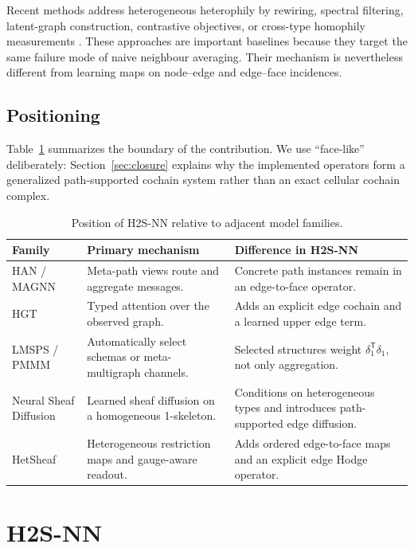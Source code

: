 \documentclass{article}
\newcommand{\method}{\textsc{H2S-NN}}
\newcommand{\transpose}{\mathsf{T}}
\begin{document}
Recent methods address heterogeneous heterophily by rewiring, spectral filtering, latent-graph
construction, contrastive objectives, or cross-type homophily measurements
\citep{guo2023hdhgr,lu2024h2sgnn,shen2024latgrl,wang2025hgms,tao2025cthge}. These approaches are
important baselines because they target the same failure mode of naive neighbour averaging. Their
mechanism is nevertheless different from learning maps on node--edge and edge--face incidences.

\subsection{Positioning}

Table~\ref{tab:positioning} summarizes the boundary of the contribution. We use ``face-like''
deliberately: Section~\ref{sec:closure} explains why the implemented operators form a generalized
path-supported cochain system rather than an exact cellular cochain complex.

\begin{table}[t]
  \centering
  \caption{Position of \method{} relative to adjacent model families.}
  \label{tab:positioning}
  \small
  \begin{tabularx}{\textwidth}{lXX}
    \toprule
    \textbf{Family} & \textbf{Primary mechanism} & \textbf{Difference in \method{}} \\
    \midrule
    HAN / MAGNN & Meta-path views route and aggregate messages. & Concrete path instances remain in an edge-to-face operator. \\
    HGT & Typed attention over the observed graph. & Adds an explicit edge cochain and a learned upper edge term. \\
    LMSPS / PMMM & Automatically select schemas or meta-multigraph channels. & Selected structures weight $\delta_1^{\transpose}\delta_1$, not only aggregation. \\
    Neural Sheaf Diffusion & Learned sheaf diffusion on a homogeneous 1-skeleton. & Conditions on heterogeneous types and introduces path-supported edge diffusion. \\
    HetSheaf & Heterogeneous restriction maps and gauge-aware readout. & Adds ordered edge-to-face maps and an explicit edge Hodge operator. \\
    \bottomrule
  \end{tabularx}
\end{table}

\section{H2S-NN}
\label{sec:method}
\end{document}
